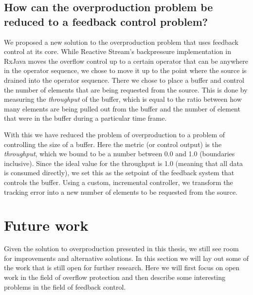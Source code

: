 \subsection*{How can the overproduction problem be reduced to a feedback control problem?}
We proposed a new solution to the overproduction problem that uses feedback control at its core. While Reactive Stream's backpressure implementation in RxJava moves the overflow control up to a certain operator that can be anywhere in the operator sequence, we chose to move it up to the point where the source is drained into the operator sequence. There we chose to place a buffer and control the number of elements that are being requested from the source. This is done by measuring the \textit{throughput} of the buffer, which is equal to the ratio between how many elements are being pulled out from the buffer and the number of element that were in the buffer during a particular time frame.

With this we have reduced the problem of overproduction to a problem of controlling the size of a buffer. Here the metric (or control output) is the \textit{throughput}, which we bound to be a number between 0.0 and 1.0 (boundaries inclusive). Since the ideal value for the throughput is 1.0 (meaning that all data is consumed directly), we set this as the setpoint of the feedback system that controls the buffer. Using a custom, incremental controller, we transform the tracking error into a new number of elements to be requested from the source.


\section{Future work}
Given the solution to overproduction presented in this thesis, we still see room for improvements and alternative solutions. In this section we will lay out some of the work that is still open for further research. Here we will first focus on open work in the field of overflow protection and then describe some interesting problems in the field of feedback control.


